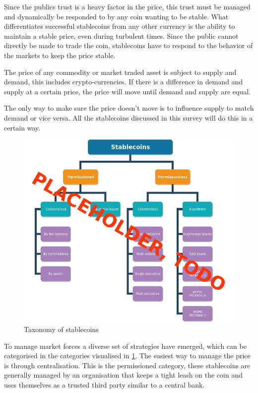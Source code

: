 \documentclass[english,]{IEEEtran}
\begin{document}
Since the publics trust is a heavy factor in the price, this trust must
be managed and dynamically be responded to by any coin wanting to be
stable. What differentiates successful stablecoins from any other
currency is the ability to maintain a stable price, even during
turbulent times. Since the public cannot directly be made to trade the
coin, stablecoins have to respond to the behavior of the markets to keep
the price stable.

The price of any commodity or market traded asset is subject to supply
and demand, this includes crypto-currencies. If there is a difference in
demand and supply at a certain price, the price will move until demand
and supply are equal.

The only way to make sure the price doesn't move is to influence supply
to match demand or vice versa. All the stablecoins discussed in this
survey will do this in a certain way.

\begin{figure}[htbp]
\centering
\includegraphics{img/intro.png}
\caption{Taxonomy of stablecoins \label{intro_label}}
\end{figure}

To manage market forces a diverse set of strategies have emerged, which
can be categorised in the categories visualised in \ref{intro_label}.
The easiest way to manage the price is through centralisation. This is
the permissioned category, these stablecoins are generally managed by an
organisation that keeps a tight leash on the coin and uses themselves as
a trusted third party similar to a central bank.
\end{document}
